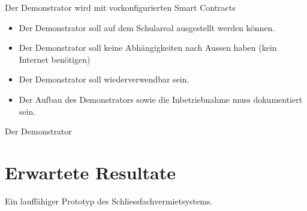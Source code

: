 Der Demonstrator wird mit vorkonfigurierten Smart Contracts 

\begin{itemize}
    \item Der Demonstrator soll auf dem Schulareal ausgestellt werden können. 
    \item Der Demonstrator soll keine Abhängigkeiten nach Aussen haben (kein Internet benötigen)
    \item Der Demonstrator soll wiederverwendbar sein.
    \item Der Aufbau des Demonstrators sowie die Inbetriebnahme muss dokumentiert sein.
\end{itemize}

Der Demonstrator 

\section{Erwartete Resultate}
\label{sec:Erwartete_Resultate}
Ein lauffähiger Prototyp des Schliessfachvermietsystems.
